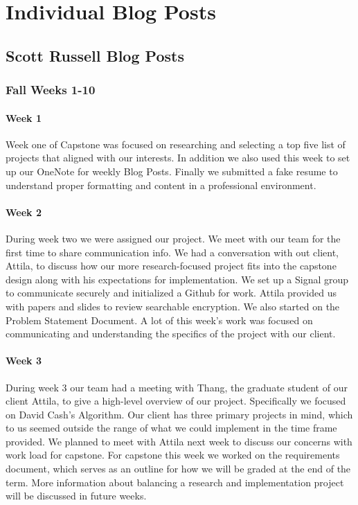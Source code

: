 
\chapter{Individual Blog Posts}

\section{Scott Russell Blog Posts}

\subsection{Fall Weeks 1-10}

\subsubsection{Week 1}
Week one of Capstone was focused on researching and selecting a top five list of projects that aligned with our interests. In addition we also used this week to set up our OneNote for weekly Blog Posts. Finally we submitted a fake resume to understand proper formatting and content in a professional environment.

\subsubsection{Week 2}
During week two we were assigned our project. We meet with our team for the first time to share communication info. We had a conversation with out client, Attila, to discuss how our more research-focused project fits into the capstone design along with his expectations for implementation. We set up a Signal group to communicate securely and initialized a Github for work. Attila provided us with papers and slides to review searchable encryption. We also started on the Problem Statement Document. A lot of this week's work was focused on communicating and understanding the specifics of the project with our client.

\subsubsection{Week 3}
During week 3 our team had a meeting with Thang, the graduate student of our client Attila, to give a high-level overview of our project. Specifically we focused on David Cash's Algorithm. Our client has three primary projects in mind, which to us seemed outside the range of what we could implement in the time frame provided. We planned to meet with Attila next week to discuss our concerns with work load for capstone. For capstone this week we worked on the requirements document, which serves as an outline for how we will be graded at the end of the term. More information about balancing a research and implementation project will be discussed in future weeks.


